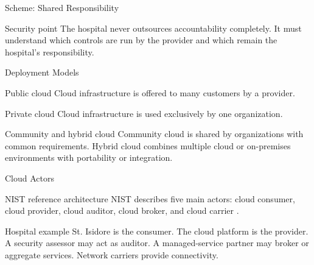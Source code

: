 \documentclass[presentation]{beamer}
\begin{document}
\begin{frame}[c]{Scheme: Shared Responsibility}
\begin{center}
\end{center}

\begin{block}{Security point}
The hospital never outsources accountability completely. It must understand which controls are run
by the provider and which remain the hospital's responsibility.
\end{block}
\end{frame}

\begin{frame}[c]{Deployment Models}
\begin{block}{Public cloud}
Cloud infrastructure is offered to many customers by a provider.
\end{block}

\begin{block}{Private cloud}
Cloud infrastructure is used exclusively by one organization.
\end{block}

\begin{block}{Community and hybrid cloud}
Community cloud is shared by organizations with common requirements. Hybrid cloud combines multiple
cloud or on-premises environments with portability or integration.
\end{block}
\end{frame}

\begin{frame}[c]{Cloud Actors}
\begin{block}{NIST reference architecture}
NIST describes five main actors: cloud consumer, cloud provider, cloud auditor, cloud broker, and
cloud carrier \cite{nist500292}.
\end{block}

\begin{exampleblock}{Hospital example}
St. Isidore is the consumer. The cloud platform is the provider. A security assessor may act as
auditor. A managed-service partner may broker or aggregate services. Network carriers provide
connectivity.
\end{exampleblock}
\end{frame}
\end{document}
